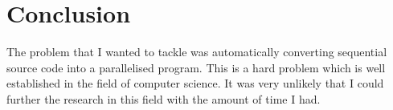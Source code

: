 \chapter{Conclusion}
The problem that I wanted to tackle was automatically converting sequential source code into a parallelised program. This is a hard problem which is well established in the field of computer science. It was very unlikely that I could further the research in this field with the amount of time I had.


